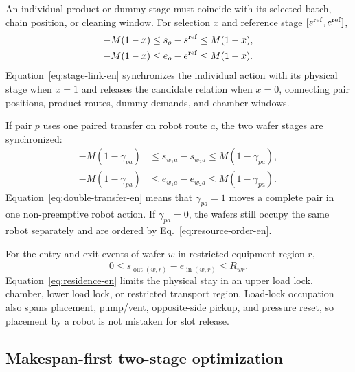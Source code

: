 \documentclass[journal]{IEEEtran}
\begin{document}
An individual product or dummy stage must coincide with its selected batch, chain position, or cleaning window. For selection $x$ and reference stage $[s^{\rm ref},e^{\rm ref}]$,
\begin{equation}
\begin{aligned}
-M(1-x)&\le s_o-s^{\rm ref}\le M(1-x),\\
-M(1-x)&\le e_o-e^{\rm ref}\le M(1-x).
\end{aligned}
\label{eq:stage-link-en}
\end{equation}
Equation~\eqref{eq:stage-link-en} synchronizes the individual action with its physical stage when $x=1$ and releases the candidate relation when $x=0$, connecting pair positions, product routes, dummy demands, and chamber windows.

If pair $p$ uses one paired transfer on robot route $a$, the two wafer stages are synchronized:
\begin{equation}
\begin{aligned}
-M(1-\gamma_{pa})&\le s_{w_1a}-s_{w_2a}\le M(1-\gamma_{pa}),\\
-M(1-\gamma_{pa})&\le e_{w_1a}-e_{w_2a}\le M(1-\gamma_{pa}).
\end{aligned}
\label{eq:double-transfer-en}
\end{equation}
Equation~\eqref{eq:double-transfer-en} means that $\gamma_{pa}=1$ moves a complete pair in one non-preemptive robot action. If $\gamma_{pa}=0$, the wafers still occupy the same robot separately and are ordered by Eq.~\eqref{eq:resource-order-en}.

For the entry and exit events of wafer $w$ in restricted equipment region $r$,
\begin{equation}
0\le s_{\operatorname{out}(w,r)}-e_{\operatorname{in}(w,r)}
\le\overline R_{wr}.
\label{eq:residence-en}
\end{equation}
Equation~\eqref{eq:residence-en} limits the physical stay in an upper load lock, chamber, lower load lock, or restricted transport region. Load-lock occupation also spans placement, pump/vent, opposite-side pickup, and pressure reset, so placement by a robot is not mistaken for slot release.

\subsection{Makespan-first two-stage optimization}
\end{document}

